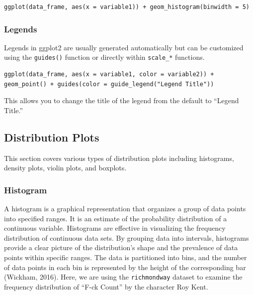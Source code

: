 \documentclass[
]{book}
\begin{document}
\begin{verbatim}
ggplot(data_frame, aes(x = variable1)) + geom_histogram(binwidth = 5)
\end{verbatim}

\hypertarget{legends}{%
\subsubsection*{Legends}\label{legends}}

Legends in ggplot2 are usually generated automatically but can be customized using the \texttt{guides()} function or directly within \texttt{scale\_*} functions.

\begin{verbatim}
ggplot(data_frame, aes(x = variable1, color = variable2)) + geom_point() + guides(color = guide_legend("Legend Title"))
\end{verbatim}

This allows you to change the title of the legend from the default to ``Legend Title.''

\hypertarget{distribution-plots}{%
\subsection*{Distribution Plots}\label{distribution-plots}}

This section covers various types of distribution plots including histograms, density plots, violin plots, and boxplots.

\hypertarget{histogram}{%
\subsubsection*{Histogram}\label{histogram}}

A histogram is a graphical representation that organizes a group of data points into specified ranges. It is an estimate of the probability distribution of a continuous variable. Histograms are effective in visualizing the frequency distribution of continuous data sets. By grouping data into intervals, histograms provide a clear picture of the distribution's shape and the prevalence of data points within specific ranges. The data is partitioned into bins, and the number of data points in each bin is represented by the height of the corresponding bar (Wickham, 2016). Here, we are using the \texttt{richmondway} dataset to examine the frequency distribution of ``F-ck Count'' by the character Roy Kent.
\end{document}
